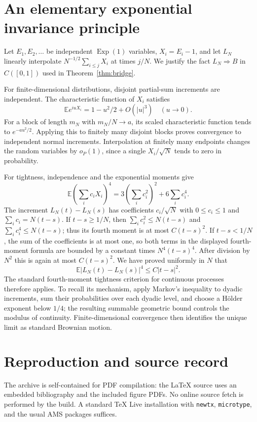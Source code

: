 \documentclass[11pt,letterpaper]{article}
\numberwithin{equation}{section}
\theoremstyle{definition}
\theoremstyle{remark}
\newcommand{\EE}{\mathbb E}
\newcommand{\Exp}{\operatorname{Exp}}
\begin{document}
\appendix
\section{An elementary exponential invariance principle}
\label{app:invariance}

Let $E_1,E_2,\ldots$ be independent $\Exp(1)$ variables, $X_i=E_i-1$, and
let $L_N$ linearly interpolate
$N^{-1/2}\sum_{i\le j}X_i$ at times $j/N$. We justify the fact
$L_N\Rightarrow B$ in $C([0,1])$ used in Theorem~\ref{thm:bridge}.

For finite-dimensional distributions, disjoint partial-sum increments are
independent. The characteristic function of $X_i$ satisfies
\[
 \EE e^{iuX_i}=1-u^2/2+O(|u|^3)\quad(u\to0).
\]
For a block of length $m_N$ with $m_N/N\to a$, its scaled characteristic
function tends to $e^{-au^2/2}$. Applying this to finitely many disjoint
blocks proves convergence to independent normal increments. Interpolation
at finitely many endpoints changes the random variables by $o_P(1)$,
since a single $X_i/\sqrt N$ tends to zero in probability.

For tightness, independence and the exponential moments give
\[
 \EE\left(\sum_i c_iX_i\right)^4
 =3\left(\sum_i c_i^2\right)^2+6\sum_i c_i^4.
\]
The increment $L_N(t)-L_N(s)$ has coefficients $c_i/\sqrt N$ with
$0\le c_i\le1$ and $\sum_i c_i=N(t-s)$. If $t-s\ge1/N$, then
$\sum_i c_i^2\le N(t-s)$ and $\sum_i c_i^4\le N(t-s)$; thus its fourth
moment is at most $C(t-s)^2$. If $t-s<1/N$, the sum of the coefficients
is at most one, so both terms in the displayed fourth-moment formula are
bounded by a constant times $N^4(t-s)^4$. After division by $N^2$ this
is again at most $C(t-s)^2$. We have proved uniformly in $N$ that
\[
 \EE|L_N(t)-L_N(s)|^4\le C|t-s|^2.
\]
The standard fourth-moment tightness criterion for continuous processes
therefore applies. To recall its mechanism, apply Markov's inequality to
dyadic increments, sum their probabilities over each dyadic level, and
choose a H\"older exponent below $1/4$; the resulting summable geometric
bound controls the modulus of continuity. Finite-dimensional convergence
then identifies the unique limit as standard Brownian motion.

\section{Reproduction and source record}
\label{app:reproduce}

The archive is self-contained for PDF compilation: the LaTeX source uses an
embedded bibliography and the included figure PDFs. No online source fetch is
performed by the build. A standard TeX Live installation with
\texttt{newtx}, \texttt{microtype}, and the usual AMS packages suffices.
\end{document}
